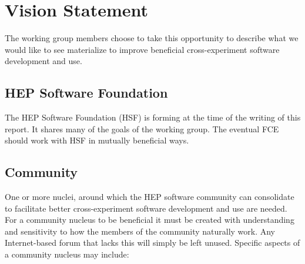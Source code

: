 \section{Vision Statement}

The working group members choose to take this opportunity to describe
what we would like to see materialize to improve beneficial
cross-experiment software development and use.

\subsection{HEP Software Foundation}

The HEP Software Foundation\cite{hsfweb} (HSF) is forming at the time
of the writing of this report.  It shares many of the goals of the
working group. The eventual FCE should work with HSF in mutually
beneficial ways.

\subsection{Community}

One or more nuclei, around which the HEP software community can
consolidate to facilitate better cross-experiment software development
and use are needed.  For a community nucleus to be beneficial it must be created
with understanding and sensitivity to how the members of the community
naturally work.  Any Internet-based forum that lacks this will simply
be left unused.  Specific aspects of a community nucleus may include:

